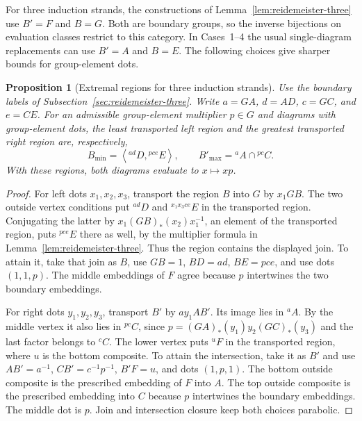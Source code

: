 \documentclass[11pt,a4paper]{article}
\numberwithin{equation}{section}
\newtheorem{proposition}[theorem]{Proposition}
\theoremstyle{definition}
\newcommand{\cg}[2]{{}^{#1}\!#2}
\begin{document}
For three induction strands, the constructions of
Lemma~\ref{lem:reidemeister-three} use \(B'=F\) and \(B=G\).
Both are boundary groups, so the inverse bijections on evaluation
classes restrict to this category. In Cases~1--4 the usual
single-diagram replacements can use \(B'=A\) and \(B=E\).
The following choices give sharper bounds for group-element dots.

\begin{proposition}[Extremal regions for three induction strands]\label{prop:parabolic-three-induction}
Use the boundary labels of Subsection~\ref{sec:reidemeister-three}.
Write \(a=\boxed{GA}\), \(d=\boxed{AD}\), \(c=\boxed{GC}\), and
\(e=\boxed{CE}\). For an admissible group-element multiplier
\(p\in G\) and diagrams with group-element dots, the least
transported left region and the greatest
transported right region are, respectively,
\[
 B_{\min}=\left\langle\cg{ad}{D},\cg{pce}{E}\right\rangle,
 \qquad
 B'_{\max}=\cg{a}{A}\cap\cg{pc}{C}.
\]
With these regions, both diagrams evaluate to \(x\mapsto xp\).
\end{proposition}

\begin{proof}
For left dots \(x_1,x_2,x_3\), transport the region \(B\) into \(G\)
by \(x_1\boxed{GB}\). The two outside vertex conditions put
\(\cg{ad}{D}\) and \(\cg{x_1x_3ce}{E}\) in the transported region.
Conjugating the latter by
\(x_1(\boxed{GB})_*(x_2)x_1^{-1}\), an element of the transported
region, puts \(\cg{pce}{E}\) there as well, by the multiplier
formula in Lemma~\ref{lem:reidemeister-three}. Thus the region
contains the displayed join. To attain it, take that join as
\(B\), use \(\boxed{GB}=1\), \(\boxed{BD}=ad\), \(\boxed{BE}=pce\),
and use dots \((1,1,p)\). The middle embeddings of \(F\) agree
because \(p\) intertwines the two boundary embeddings.

For right dots \(y_1,y_2,y_3\), transport \(B'\) by
\(a y_1\boxed{AB'}\). Its image lies in \(\cg{a}{A}\). By the
middle vertex it also lies in \(\cg{pc}{C}\), since
\(p=(\boxed{GA})_*(y_1)y_2(\boxed{GC})_*(y_3)\) and the last factor
belongs to \(\cg{c}{C}\). The lower vertex puts \(\cg{u}{F}\) in
the transported region, where \(u\) is the bottom composite.
To attain the intersection, take it as \(B'\) and use
\(\boxed{AB'}=a^{-1}\), \(\boxed{CB'}=c^{-1}p^{-1}\),
\(\boxed{B'F}=u\), and dots \((1,p,1)\). The bottom outside
composite is the prescribed embedding of \(F\) into \(A\).
The top outside composite is the prescribed embedding into \(C\)
because \(p\) intertwines the boundary embeddings. The middle
dot is \(p\). Join and intersection closure keep both choices
parabolic.
\end{proof}
\end{document}
